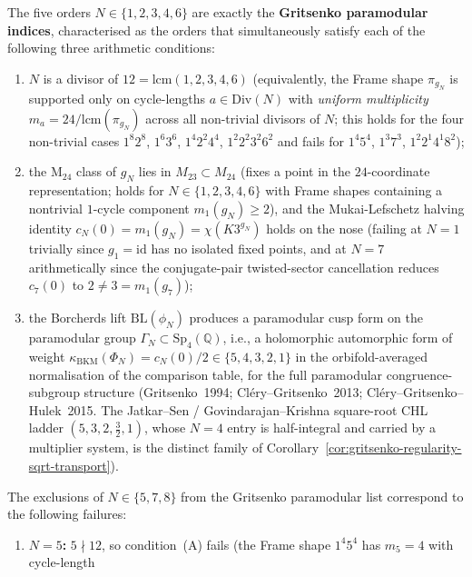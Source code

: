 \begin{proposition}
The five orders $N \in \{1, 2, 3, 4, 6\}$ are exactly the
\textbf{Gritsenko paramodular indices}, characterised as the orders
that simultaneously satisfy each of the following three arithmetic
conditions:
\begin{enumerate}[label=\textup{(\Alph*)}]
 \item $N$ is a divisor of $12 = \mathrm{lcm}(1, 2, 3, 4, 6)$
 \textup{(}equivalently, the Frame shape $\pi_{g_N}$ is supported only
 on cycle-lengths $a \in \mathrm{Div}(N)$ with \emph{uniform
 multiplicity} $m_a = 24/\mathrm{lcm}(\pi_{g_N})$ across all
 non-trivial divisors of $N$; this holds for the four non-trivial
 cases $1^8 2^8$, $1^6 3^6$, $1^4 2^2 4^4$, $1^2 2^2 3^2 6^2$ and
 fails for $1^4 5^4$, $1^3 7^3$, $1^2 2^1 4^1 8^2$\textup{);}
 \item the M$_{24}$ class of $g_N$ lies in $M_{23} \subset M_{24}$
 \textup{(}fixes a point in the $24$-coordinate representation;
 holds for $N \in \{1, 2, 3, 4, 6\}$ with Frame shapes containing a
 nontrivial $1$-cycle component $m_1(g_N) \ge 2$\textup{)}, and
 the Mukai-Lefschetz halving identity
 $c_N(0) = m_1(g_N) = \chi(K3^{g_N})$ holds on the nose
 \textup{(}failing at $N = 1$ trivially since $g_1 = \mathrm{id}$ has
 no isolated fixed points, and at $N = 7$ arithmetically since the
 conjugate-pair twisted-sector cancellation reduces
 $c_7(0)$ to $2 \ne 3 = m_1(g_7)$\textup{);}
 \item the Borcherds lift $\mathrm{BL}(\phi_N)$ produces a paramodular
 cusp form on the paramodular
 group $\Gamma_N \subset \mathrm{Sp}_4(\mathbb{Q})$, i.e., a
 holomorphic automorphic form of weight
 $\kappa_{\mathrm{BKM}}(\Phi_N) = c_N(0)/2 \in \{5, 4, 3, 2, 1\}$
 in the orbifold-averaged normalisation of the comparison table,
 for the full paramodular congruence-subgroup structure
 \textup{(}Gritsenko~1994; Cl\'ery--Gritsenko~2013;
 Cl\'ery--Gritsenko--Hulek~2015. The Jatkar--Sen /
 Govindarajan--Krishna square-root CHL ladder
 $(5, 3, 2, \tfrac32, 1)$, whose $N = 4$ entry is half-integral and
 carried by a multiplier system, is the distinct family of
 Corollary~\ref{cor:gritsenko-regularity-sqrt-transport}\textup{)}.
\end{enumerate}
The exclusions of $N \in \{5, 7, 8\}$ from the Gritsenko paramodular
list correspond to the following failures:
\begin{enumerate}[label=\textup{(\arabic*)}]
 \item \textbf{$N = 5$:} $5 \nmid 12$, so condition~(A) fails
 \textup{(}the Frame shape $1^4 5^4$ has $m_5 = 4$ with cycle-length

\end{enumerate}
\end{proposition}
